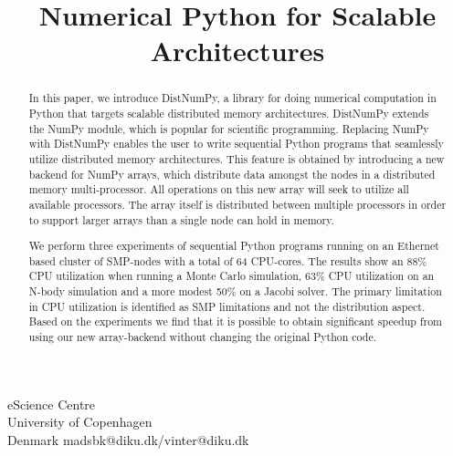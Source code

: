 \documentclass{sigplanconf}
\begin{document}


\title{Numerical Python for Scalable Architectures}

           {eScience Centre\\ University of Copenhagen\\ Denmark}
           {madsbk@diku.dk/vinter@diku.dk}

\maketitle

\begin{abstract}
In this paper, we introduce DistNumPy, a library for doing numerical computation in Python that targets scalable distributed memory architectures. DistNumPy extends the NumPy module\cite{numpy}, which is popular for scientific programming. Replacing NumPy with DistNumPy enables the user to write sequential Python programs that seamlessly utilize distributed memory architectures. This feature is obtained by introducing a new backend for NumPy arrays, which distribute data amongst the nodes in a distributed memory multi-processor. All operations on this new array will seek to utilize all available processors. The array itself is distributed between multiple processors in order to support larger arrays than a single node can hold in memory. 

We perform three experiments of sequential Python programs running on an Ethernet based cluster of SMP-nodes with a total of 64 CPU-cores. The results show an 88\% CPU utilization when running a Monte Carlo simulation, 63\% CPU utilization on an N-body simulation and a more modest 50\% on a Jacobi solver. The primary limitation in CPU utilization is identified as SMP limitations and not the distribution aspect. Based on the experiments we find that it is possible to obtain significant speedup from using our new array-backend without changing the original Python code.
\end{abstract}


\end{document}
